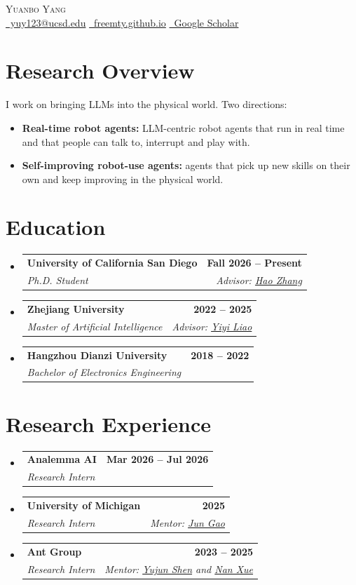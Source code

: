 \documentclass[letterpaper,11pt]{article}
\makeatletter
\newcommand{\cvSubheading}[4]{
  \vspace{-2pt}\item
    \begin{tabular*}{1.0\textwidth}[t]{l@{\extracolsep{\fill}}r}
      \textbf{#1} & \textbf{\small #2} \\
      \textit{\small#3} & \textit{\small #4} \\
    \end{tabular*}\vspace{-7pt}
}
\newcommand{\cvListStart}{\begin{itemize}[leftmargin=0.0in, label={}]}
\newcommand{\cvListEnd}{\end{itemize}}
\makeatother
\begin{document}
\begin{center}
  {\Huge\scshape Yuanbo Yang} \\[8pt]
  \small
  \href{mailto:yuy123@ucsd.edu}{\faEnvelope\ yuy123@ucsd.edu} \quad
  \href{https://freemty.github.io/}{\faGlobe\ freemty.github.io} \quad
  \href{https://scholar.google.com/citations?user=aVOAL6cAAAAJ}{\faGoogle\ Google Scholar}
\end{center}

\section{Research Overview}

I work on bringing LLMs into the physical world. Two directions:
\begin{itemize}[leftmargin=0.2in]
  \item \textbf{Real-time robot agents:} LLM-centric robot agents that run in real time and that people can talk to, interrupt and play with.
  \item \textbf{Self-improving robot-use agents:} agents that pick up new skills on their own and keep improving in the physical world.
\end{itemize}

\section{Education}
\cvListStart
  \cvSubheading
    {University of California San Diego}{Fall 2026 -- Present}
    {Ph.D. Student}{Advisor: \href{https://cseweb.ucsd.edu/~haozhang/}{Hao Zhang}}
  \cvSubheading
    {Zhejiang University}{2022 -- 2025}
    {Master of Artificial Intelligence}{Advisor: \href{https://yiyiliao.github.io/}{Yiyi Liao}}
  \cvSubheading
    {Hangzhou Dianzi University}{2018 -- 2022}
    {Bachelor of Electronics Engineering}{}
\cvListEnd

\section{Research Experience}
\cvListStart
  \cvSubheading
    {Analemma AI}{Mar 2026 -- Jul 2026}
    {Research Intern}{}
  \cvSubheading
    {University of Michigan}{2025}
    {Research Intern}{Mentor: \href{https://www.cs.toronto.edu/~jungao/}{Jun Gao}}
  \cvSubheading
    {Ant Group}{2023 -- 2025}
    {Research Intern}{Mentor: \href{https://shenyujun.github.io/}{Yujun Shen} and \href{https://xuenan.net/}{Nan Xue}}
\cvListEnd
\end{document}
